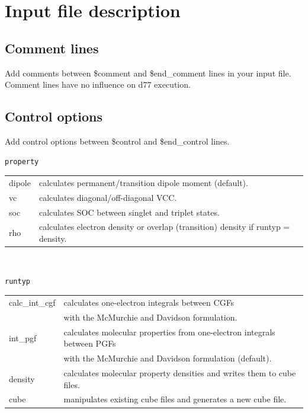 ﻿\documentclass[11pt,a4paper,openany]{article}
\begin{document}
\clearpage
\section{Input file description}

\subsection{Comment lines}
\noindent
Add comments between \$comment and \$end\_comment lines in your input file. Comment lines have no influence on d77 execution.

\subsection{Control options}
\noindent
Add control options between \$control and \$end\_control lines.

\begin{verbatim}
property
\end{verbatim}
\begin{tabular}{ll}
dipole & calculates permanent/transition dipole moment (default).\\
vc & calculates diagonal/off-diagonal VCC. \\
soc & calculates SOC between singlet and triplet states.\\
rho & calculates electron density or overlap (transition) density if runtyp = density.
\end{tabular}
\\

\begin{verbatim}
runtyp
\end{verbatim}
\begin{tabular}{ll}
calc\_int\_cgf & calculates one-electron integrals between CGFs\\
                   & with the McMurchie and Davidson formulation.\cite{MCMURCHIE1978218} \\
int\_pgf & calculates molecular properties from one-electron integrals between PGFs \\
           & with the McMurchie and Davidson formulation\cite{MCMURCHIE1978218}  (default).\\
density & calculates molecular property densities and writes them to cube files.\\
cube & manipulates existing cube files and generates a new cube file.\\
\end{tabular}
\\
\end{document}
